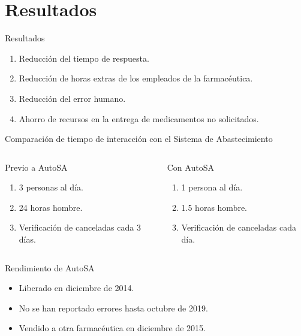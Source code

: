 \section{Resultados}
	\begin{frame}{Resultados}
		\begin{enumerate}
			\item Reducción del tiempo de respuesta.
			\item Reducción de horas extras de los empleados de la farmacéutica.
			\item Reducción del error humano.
			\item Ahorro de recursos en la entrega de medicamentos no solicitados.
		\end{enumerate}
	\end{frame}

	\begin{frame}{Comparación de tiempo de interacción con el Sistema de Abastecimiento}
		\begin{columns}[t]
			\begin{block}{Previo a AutoSA}
				\begin{enumerate}
					\item 3 personas al día.
					\item 24 horas hombre.
					\item Verificación de canceladas cada 3 días.
				\end{enumerate}
			\end{block}

			\begin{block}{Con AutoSA}
				\begin{enumerate}
					\item 1 persona al día.
					\item 1.5 horas hombre.
					\item Verificación de canceladas cada día.
				\end{enumerate}
			\end{block}
		\end{columns}
	\end{frame}

	\begin{frame}{Rendimiento de AutoSA}
		\begin{itemize}
			\item Liberado en diciembre de 2014. 
			\item No se han reportado errores hasta octubre de 2019.
			\item Vendido a otra farmacéutica en diciembre de 2015.
		\end{itemize}
	\end{frame}

